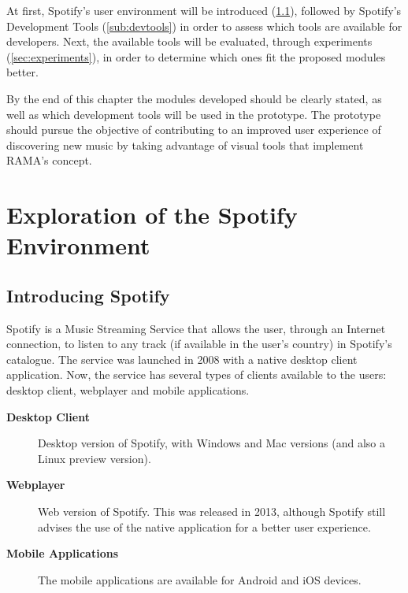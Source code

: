At first, Spotify's user environment will be introduced (\ref{sub:intro_spotify}), followed by Spotify's Development Tools (\ref{sub:devtools}) in order to assess which tools are available for developers.
Next, the available tools will be evaluated, through experiments (\ref{sec:experiments}), in order to determine which ones fit the proposed modules better.

By the end of this chapter the modules developed should be clearly stated, as well as which development tools will be used in the prototype.
The prototype should pursue the objective of contributing to an improved user experience of discovering new music by taking advantage of visual tools that implement RAMA's concept.

\section{Exploration of the Spotify Environment} %
\label{sec:exploration_of_the_spotify_environment}

  \subsection{Introducing Spotify} %
  \label{sub:intro_spotify}

    Spotify is a Music Streaming Service that allows the user, through an Internet connection, to listen to any track (if available in the user's country) in Spotify's catalogue.
    The service was launched in 2008 with a native desktop client application.
    Now, the service has several types of clients available to the users: desktop client, webplayer and mobile applications.

    \begin{description}
      \item[\textbf{Desktop Client}] Desktop version of Spotify, with Windows and Mac versions (and also a Linux preview version).
      \item[\textbf{Webplayer}] Web version of Spotify. This was released in 2013, although Spotify still advises the use of the native application for a better user experience.
      \item[\textbf{Mobile Applications}] The mobile applications are available for Android and iOS devices.
    \end{description}

    
